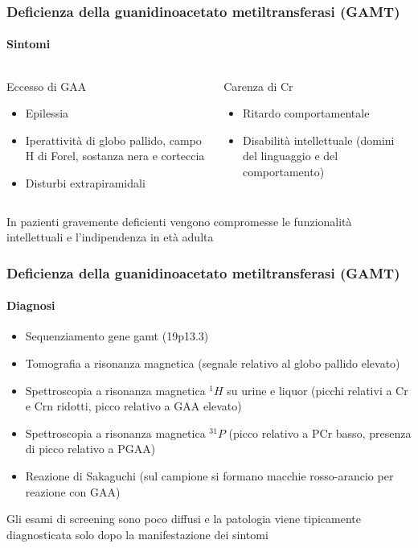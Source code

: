 \begin{frame}
\frametitle {Deficienza della guanidinoacetato metiltransferasi (GAMT)}
\framesubtitle {Sintomi}
\begin{columns}[t]
\begin{block}{Eccesso di GAA}
\begin{itemize}
	\item Epilessia
	\item Iperattivit\`a di globo pallido, campo H di Forel, sostanza nera e corteccia
	\item Disturbi extrapiramidali
\end{itemize}
\end{block}

\begin{block}{Carenza di Cr}
	\begin{itemize}
		\item Ritardo comportamentale
		\item Disabilit\`a intellettuale (domini del linguaggio e del comportamento)
	\end{itemize}
	\end{block}
\end{columns}

In pazienti gravemente deficienti vengono compromesse le funzionalit\`a intellettuali e l'indipendenza in et\`a adulta

\end{frame}

\begin{frame}
	\frametitle {Deficienza della guanidinoacetato metiltransferasi (GAMT)}
	\framesubtitle {Diagnosi}

\begin{itemize}
	\item Sequenziamento gene gamt (19p13.3)
	\item Tomografia a risonanza magnetica (segnale relativo al globo pallido elevato)
	\item Spettroscopia a risonanza magnetica $^1H$ su urine e liquor (picchi relativi a Cr e Crn ridotti, picco relativo a GAA elevato)
	\item Spettroscopia a risonanza magnetica $^{31}P$ (picco relativo a PCr basso, presenza di picco relativo a PGAA)
	\item Reazione di Sakaguchi (sul campione si formano macchie rosso-arancio per reazione con GAA)
\end{itemize}

Gli esami di screening sono poco diffusi e la patologia viene tipicamente diagnosticata solo dopo la manifestazione dei sintomi

\end{frame}


